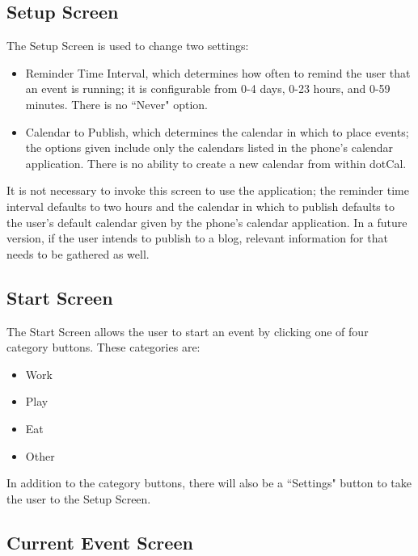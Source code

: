 \documentclass[11pt]{article}
\begin{document}
\subsection{Setup Screen} 

The Setup Screen is used to change two settings:

\begin{itemize}
	\item{Reminder Time Interval, which determines how often to remind the user that an event is running; it is configurable from 0-4 days, 0-23 hours, and 0-59 minutes. There is no ``Never" option.}
	\item{Calendar to Publish, which determines the calendar in which to place events; the options given include only the calendars listed in the phone's calendar application. There is no ability to create a new calendar from within dotCal.}
\end{itemize}

It is not necessary to invoke this screen to use the application; the reminder time interval defaults to two hours and the calendar in which to publish defaults to the user's default calendar given by the phone's calendar application. In a future version, if the user intends to publish to a blog, relevant information for that needs to be gathered as well.



\subsection{Start Screen}

The Start Screen allows the user to start an event by clicking one of four category buttons. These categories are:

\begin{itemize}
	\item{Work} 
	\item{Play}
	\item{Eat}
	\item{Other}
\end{itemize}

In addition to the category buttons, there will also be a ``Settings" button to take the user to the Setup Screen.

\subsection{Current Event Screen}
\end{document}
